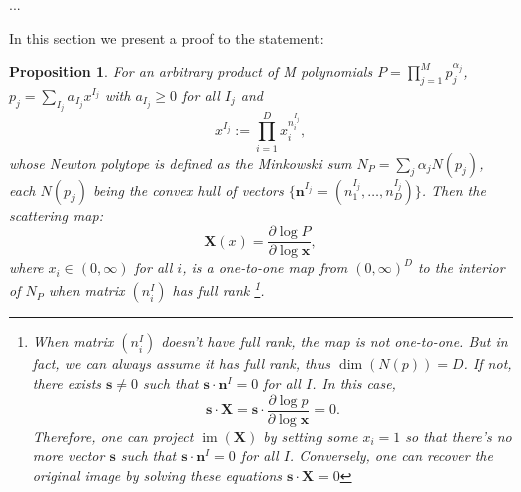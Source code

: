 \documentclass[12pt]{article}
\theoremstyle{definition}
\theoremstyle{plain}
\newtheorem{pro}[para]{Proposition}
\begin{document}

...

In this section we present a proof to the statement:
\begin{pro}
For an arbitrary product of M polynomials $P=\prod_{j=1}^M p_j^{\alpha_j}$, $p_j=\sum_{I_j} a_{I_j} x^{I_j}$ with $a_{I_j}\geq 0$ for all $I_j$ and
 \[
	x^{I_j}:=\prod_{i=1}^D x_i^{n^{I_j}_i},
\]
whose Newton polytope is defined as the Minkowski sum  $N_P=\sum_j \alpha_j N(p_j)$, 
each $N(p_j)$ being the convex hull of vectors 
$\{\mathbf{n}^{I_j}=(n^{I_j}_1,\dots,n^{I_j}_D)\}$. Then the scattering map:
\[
	\mathbf X(x)=\frac{\partial \log P}{\partial \log \mathbf x},
\]
where $x_i\in (0,\infty)$ for all $i$, is a one-to-one map from $(0,\infty)^D$ to the interior of $N_P$ when matrix $(n_i^I)$ has full rank
\footnote{When matrix $(n_i^I)$ doesn't have full rank, the map is not one-to-one. 
	But in fact, we can always assume it has full rank, thus $\dim (N(p))=D$. 
	If not, there exists $\mathbf s\neq 0$ such that $\mathbf s \cdot \mathbf n^I=0$ for all $I$. 
	In this case,
\[
	\mathbf s\cdot\mathbf X=\mathbf s\cdot\frac{\partial \log p}{\partial \log \mathbf x}=0.
\]
Therefore, one can project $\operatorname{im}(\mathbf X)$ by setting some $x_i=1$ so that there's no more vector $\mathbf s$ such that $\mathbf s\cdot \mathbf n^I=0$ for all $I$. Conversely, one can recover the original image by solving these equations $\mathbf s\cdot\mathbf X=0$}. 
\end{pro}
\end{document}
